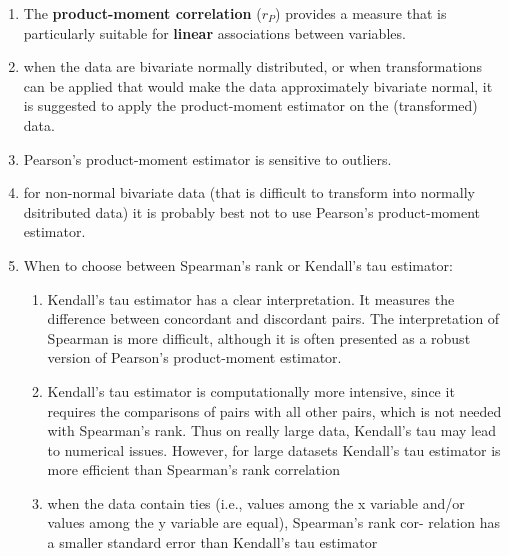 \begin{enumerate}
    \item The \textbf{product-moment correlation} ($r_P$) provides a measure that is particularly suitable for \textbf{linear} associations between variables.
    \hfill \cite{statistics/book/Statistics-for-Data-Scientists/Maurits-Kaptein}

    \item when the data are bivariate normally distributed, or when transformations can be applied that would make the data approximately bivariate normal, it is suggested to apply the product-moment estimator on the (transformed) data.
    \hfill \cite{statistics/book/Statistics-for-Data-Scientists/Maurits-Kaptein}

    \item Pearson’s product-moment estimator is sensitive to outliers.
    \hfill \cite{statistics/book/Statistics-for-Data-Scientists/Maurits-Kaptein}

    \item for non-normal bivariate data (that is difficult to transform into normally dsitributed data) it is probably best not to use Pearson’s product-moment estimator.
    \hfill \cite{statistics/book/Statistics-for-Data-Scientists/Maurits-Kaptein}

    \item When to choose between Spearman’s rank or Kendall’s tau estimator:
    \hfill \cite{statistics/book/Statistics-for-Data-Scientists/Maurits-Kaptein}
    \begin{enumerate}
        \item Kendall’s tau estimator has a clear interpretation.
        It measures the difference between concordant and discordant pairs.
        The interpretation of Spearman is more difficult, although it is often presented as a robust version of Pearson’s product-moment estimator.
        \hfill \cite{statistics/book/Statistics-for-Data-Scientists/Maurits-Kaptein}

        \item Kendall’s tau estimator is computationally more intensive, since it requires the comparisons of pairs with all other pairs, which is not needed with Spearman’s rank.
        Thus on really large data, Kendall’s tau may lead to numerical issues. However, for large datasets Kendall’s tau estimator is more efficient than Spearman’s rank correlation
        \hfill \cite{statistics/book/Statistics-for-Data-Scientists/Maurits-Kaptein}

        \item when the data contain ties (i.e., values among the x variable and/or values among the y variable are equal), Spearman’s rank cor- relation has a smaller standard error than Kendall’s tau estimator
        \hfill \cite{statistics/book/Statistics-for-Data-Scientists/Maurits-Kaptein}
    \end{enumerate}


\end{enumerate}
